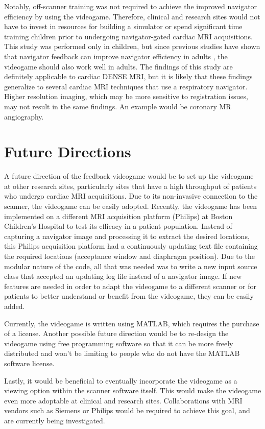 	Notably, off-scanner training was not required to achieve the improved navigator efficiency by using the videogame. Therefore, clinical and research sites would not have to invest in resources for building a simulator or spend significant time training children prior to undergoing navigator-gated cardiac MRI acquisitions. This study was performed only in children, but since previous studies have shown that navigator feedback can improve navigator efficiency in adults \cite{Feuerlein2009,Liu1993}, the videogame should also work well in adults. The findings of this study are definitely applicable to cardiac DENSE MRI, but it is likely that these findings generalize to several cardiac MRI techniques that use a respiratory navigator. Higher resolution imaging, which may be more sensitive to registration issues, may not result in the same findings. An example would be coronary MR angiography.

\section{Future Directions}
	A future direction of the feedback videogame would be to set up the videogame at other research sites, particularly sites that have a high throughput of patients who undergo cardiac MRI acquisitions. Due to its non-invasive connection to the scanner, the videogame can be easily adopted. Recently, the videogame has been implemented on a different MRI acquisition platform (Philips) at Boston Children's Hospital to test its efficacy in a patient population. Instead of capturing a navigator image and processing it to extract the desired locations, this Philips acquisition platform had a continuously updating text file containing the required locations (acceptance window and diaphragm position). Due to the modular nature of the code, all that was needed was to write a new input source class that accepted an updating log file instead of a navigator image. If new features are needed in order to adapt the videogame to a different scanner or for patients to better understand or benefit from the videogame, they can be easily added.
	
	Currently, the videogame is written using MATLAB, which requires the purchase of a license. Another possible future direction would be to re-design the videogame using free programming software so that it can be more freely distributed and won't be limiting to people who do not have the MATLAB software license. 
	
	Lastly, it would be beneficial to eventually incorporate the videogame as a viewing option within the scanner software itself. This would make the videogame even more adoptable at clinical and research sites. Collaborations with MRI vendors such as Siemens or Philips would be required to achieve this goal, and are currently being investigated.

